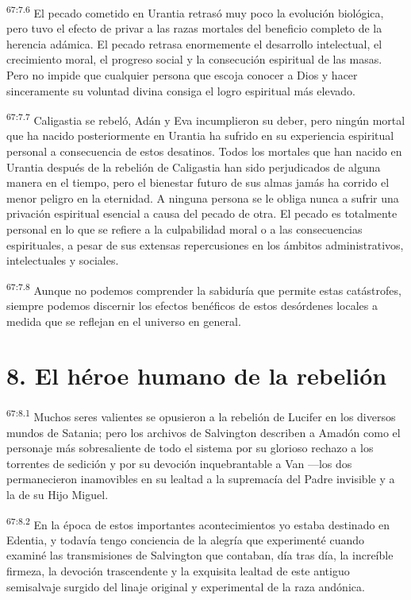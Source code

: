 \par
\textsuperscript{67:7.6} El pecado cometido en Urantia retrasó muy poco la evolución biológica, pero tuvo el efecto de privar a las razas mortales del beneficio completo de la herencia adámica. El pecado retrasa enormemente el desarrollo intelectual, el crecimiento moral, el progreso social y la consecución espiritual de las masas. Pero no impide que cualquier persona que escoja conocer a Dios y hacer sinceramente su voluntad divina consiga el logro espiritual más elevado.

\par
\textsuperscript{67:7.7} Caligastia se rebeló, Adán y Eva incumplieron su deber, pero ningún mortal que ha nacido posteriormente en Urantia ha sufrido en su experiencia espiritual personal a consecuencia de estos desatinos. Todos los mortales que han nacido en Urantia después de la rebelión de Caligastia han sido perjudicados de alguna manera en el tiempo, pero el bienestar futuro de sus almas jamás ha corrido el menor peligro en la eternidad. A ninguna persona se le obliga nunca a sufrir una privación espiritual esencial a causa del pecado de otra. El pecado es totalmente personal en lo que se refiere a la culpabilidad moral o a las consecuencias espirituales, a pesar de sus extensas repercusiones en los ámbitos administrativos, intelectuales y sociales.

\par
\textsuperscript{67:7.8} Aunque no podemos comprender la sabiduría que permite estas catástrofes, siempre podemos discernir los efectos benéficos de estos desórdenes locales a medida que se reflejan en el universo en general.

\section*{8. El héroe humano de la rebelión}
\par
\textsuperscript{67:8.1} Muchos seres valientes se opusieron a la rebelión de Lucifer en los diversos mundos de Satania; pero los archivos de Salvington describen a Amadón como el personaje más sobresaliente de todo el sistema por su glorioso rechazo a los torrentes de sedición y por su devoción inquebrantable a Van ---los dos permanecieron inamovibles en su lealtad a la supremacía del Padre invisible y a la de su Hijo Miguel.

\par
\textsuperscript{67:8.2} En la época de estos importantes acontecimientos yo estaba destinado en Edentia, y todavía tengo conciencia de la alegría que experimenté cuando examiné las transmisiones de Salvington que contaban, día tras día, la increíble firmeza, la devoción trascendente y la exquisita lealtad de este antiguo semisalvaje surgido del linaje original y experimental de la raza andónica.

